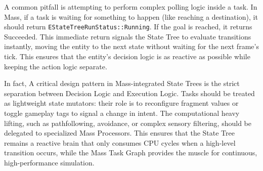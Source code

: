 A common pitfall is attempting to perform complex polling logic inside a task. In Mass, if a task is waiting for something to happen (like reaching a destination), it should return \texttt{EStateTreeRunStatus::Running}. If the goal is reached, it returns Succeeded. This immediate return signals the State Tree to evaluate transitions instantly, moving the entity to the next state without waiting for the next frame's tick. This ensures that the entity's decision logic is as reactive as possible while keeping the action logic separate.

In fact, A critical design pattern in Mass-integrated State Trees is the strict separation between Decision Logic and Execution Logic. Tasks should be treated as lightweight state mutators: their role is to reconfigure fragment values or toggle gameplay tags to signal a change in intent. The computational heavy lifting, such as pathfollowing, avoidance, or complex sensory filtering, should be delegated to specialized Mass Processors. This ensures that the State Tree remains a reactive brain that only consumes CPU cycles when a high-level transition occurs, while the Mass Task Graph provides the muscle for continuous, high-performance simulation.



